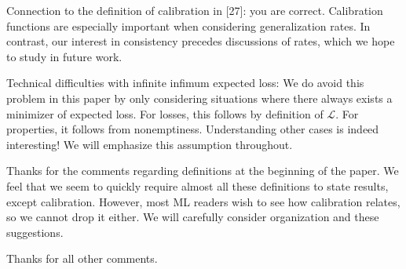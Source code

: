 \documentclass{article}
\begin{document}
Connection to the definition of calibration in [27]: you are correct. Calibration functions are especially important when considering generalization rates. In contrast, our interest in consistency precedes discussions of rates, which we hope to study in future work.

Technical difficulties with infinite infimum expected loss: We do avoid this problem in this paper by only considering situations where there always exists a minimizer of expected loss. For losses, this follows by definition of $\mathcal{L}$. For properties, it follows from nonemptiness. Understanding other cases is indeed interesting! We will emphasize this assumption throughout.

Thanks for the comments regarding definitions at the beginning of the paper. We feel that we seem to quickly require almost all these definitions to state results, except calibration. However, most ML readers wish to see how calibration relates, so we cannot drop it either.  We will carefully consider organization and these suggestions.

Thanks for all other comments.
\end{document}
